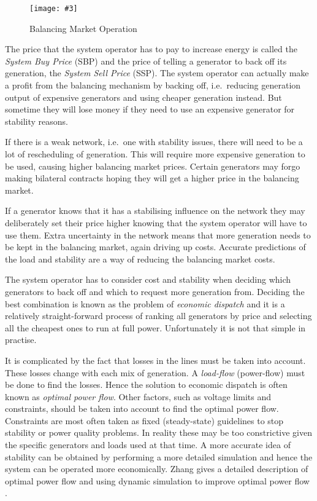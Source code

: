 \documentclass[a4paper,oneside,12pt]{report}
\newcommand{\image}[3] {
  \begin{figure}
    \begin{center}
      \texttt{[image: \#3]}
      \caption{#2}
      \label{#1}
    \end{center}
  \end{figure}
}
\begin{document}
\image{balancing}{Balancing Market Operation}{balancing.png}

The price that the system operator has to pay to increase energy is called the \emph{System Buy Price} (SBP) and the price of telling a generator to back off its generation, the \emph{System Sell Price} (SSP). The system operator can actually make a profit from the balancing mechanism by backing off, i.e.\ reducing generation output of expensive generators and using cheaper generation instead. But sometime they will lose money if they need to use an expensive generator for stability reasons.

If there is a weak network, i.e.\ one with stability issues, there will need to be a lot of rescheduling of generation. This will require more expensive generation to be used, causing higher balancing market prices. Certain generators may forgo making bilateral contracts hoping they will get a higher price in the balancing market.


If a generator knows that it has a stabilising influence on the network they may deliberately set their price higher knowing that the system operator will have to use them. Extra uncertainty in the network means that more generation needs to be kept in the balancing market, again driving up costs. Accurate predictions of the load and stability are a way of reducing the balancing market costs.

The system operator has to consider cost and stability when deciding which generators to back off and which to request more generation from. Deciding the best combination is known as the problem of \emph{economic dispatch} and it is a relatively straight-forward process of ranking all generators by price and selecting all the cheapest ones to run at full power. Unfortunately it is not that simple in practise.

It is complicated by the fact that losses in the lines must be taken into account. These losses change with each mix of generation. A \emph{load-flow} (power-flow) must be done to find the losses. Hence the solution to economic dispatch is often known as \emph{optimal power flow}. Other factors, such as voltage limits and constraints, should be taken into account to find the optimal power flow. Constraints are most often taken as fixed (steady-state) guidelines to stop stability or power quality problems. In reality these may be too constrictive given the specific generators and loads used at that time. A more accurate idea of stability can be obtained by performing a more detailed simulation and hence the system can be operated more economically. Zhang gives a detailed description of optimal power flow and using dynamic simulation to improve optimal power flow \cite{Zhang2007}.
\end{document}

